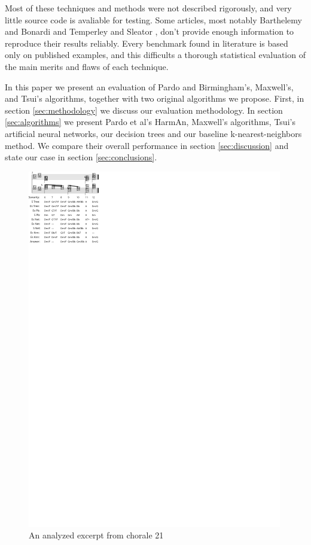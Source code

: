 \documentclass{article}
\begin{document}
Most of these techniques and methods were not described rigorously,
and very little source code is avaliable for testing. Some articles,
most notably Barthelemy and Bonardi \cite{barthelemy.ea:figured} and
Temperley and Sleator \cite{temperley.ea:modeling}, don't provide
enough information to reproduce their results reliably. Every
benchmark found in literature \cite{pardo.ea:automated,
  barthelemy.ea:figured, tsui:harmonic, taube:automatic,
  illescas.ea:harmonic} is based only on published examples, and this
difficults a thorough statistical evaluation of the main merits and
flaws of each technique.

In this paper we present an evaluation of Pardo and Birmingham's,
Maxwell's, and Tsui's algorithms, together with two original
algorithms we propose.  First, in section \ref{sec:methodology} we
discuss our evaluation methodology. In section \ref{sec:algorithms} we
present Pardo et al's HarmAn, Maxwell's algorithms, Tsui's artificial
neural networks, our decision trees and our baseline
k-nearest-neighbors method. We compare their overall performance in
section \ref{sec:discussion} and state our case in section
\ref{sec:conclusions}.

\begin{figure}
  \centering
  \includegraphics[scale=4]{coral-021}
  \caption{An analyzed excerpt from chorale 21}
  \label{fig:coral-021}
\end{figure}
\end{document}
